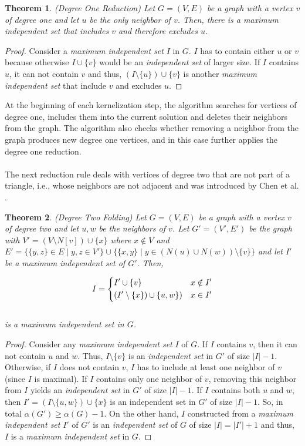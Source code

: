 \documentclass[]{article}
\newtheorem{theorem}{Theorem}
\begin{document}
\begin{theorem} (Degree One Reduction) Let $G=(V,E)$ be a graph with a vertex $v$ of degree one and let $u$ be the only neighbor of $v$. Then, there is a \textit{maximum independent set} that includes $v$ and therefore excludes $u$.	
\end{theorem}
\begin{proof}
	Consider a \textit{maximum independent set} $I$ in $G$. $I$ has to contain either $u$ or $v$ because otherwise $I\cup\{v\}$ would be an \textit{independent set} of larger size. If $I$ contains $u$, it can not contain $v$ and thus, $(I\setminus\{u\})\cup\{v\}$ is another  \textit{maximum independent set} that include $v$ and excludes $u$.
\end{proof}

At the beginning of each kernelization step, the algorithm searches for vertices of degree one, includes them into the current solution and deletes their neighbors from the graph. The algorithm also checks whether removing a neighbor from the graph produces new degree one vertices, and in this case further applies the degree one reduction. \\\\
The next reduction rule deals with vertices of degree two that are not part of a triangle, i.e., whose neighbors are not adjacent and was introduced by Chen et al. \cite{ChenDeg2}.

\begin{theorem} (Degree Two Folding) Let $G=(V,E)$ be a graph with a vertex $v$ of degree two and let $u,w$ be the neighbors of $v$. Let $G'=(V',E')$ be the graph with $V'=(V\setminus N[v])\cup \{x\}$ where $x\notin V$ and $E'=\{ \{y,z\}\in E\;|\;y,z\in V'\}\cup\{ \{x,y\}\;|\;y\in(N(u)\cup N(w))\setminus\{v\} \}$ and let $I'$ be a \textit{maximum independent set} of $G'$. Then,
	
	\[I=\begin{dcases}
	I'\cup \{v\} & x\notin I'\\
	(I'\setminus\{x\})\cup \{u,w\}) & x\in I'
	\end{dcases}\]\\
	is a \textit{maximum independent set} in $G$.
\end{theorem}
\begin{proof}
	Consider any \textit{maximum independent set} $I$ of $G$. If $I$ contains $v$, then it can not contain $u$ and $w$. Thus, $I\setminus\{v\}$ is an \textit{independent set} in $G'$ of size $|I| - 1$. Otherwise, if $I$ does not contain $v$, $I$ has to include at least one neighbor of $v$ (since $I$ is maximal). If $I$ contains only one neighbor of $v$, removing this neighbor from $I$ yields an \textit{independent set} in $G'$ of size $|I|-1$. If $I$ contains both $u$ and $w$, then $I'=(I\setminus\{u,w\})\cup\{x\}$ is an independent set in $G'$ of size $|I|-1$. So, in total $\alpha(G')\geq \alpha(G) -1$. On the other hand, $I$ constructed from a \textit{maximum independent set} $I'$ of $G'$ is an \textit{independent set} of $G$ of size $|I| = |I'|+1$ and thus, $I$ is a \textit{maximum independent set} in $G$.
\end{proof}
\end{document}
